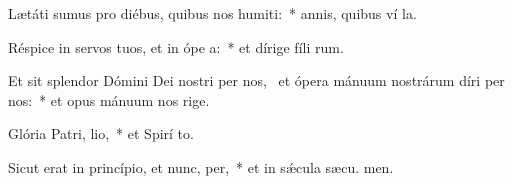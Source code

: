 \item Lætáti sumus pro diébus, quibus nos humiti:~* annis, quibus ví la.
\item Réspice in servos tuos, et in ópe a:~* et dírige fíli rum.
\item Et sit splendor Dómini Dei nostri per nos,~\pscross{} et ópera mánuum nostrárum díri per nos:~* et opus mánuum nos rige.
\item Glória Patri,  lio,~* et Spirí to.
\item Sicut erat in princípio, et nunc,  per,~* et in sǽcula sæcu. men.
